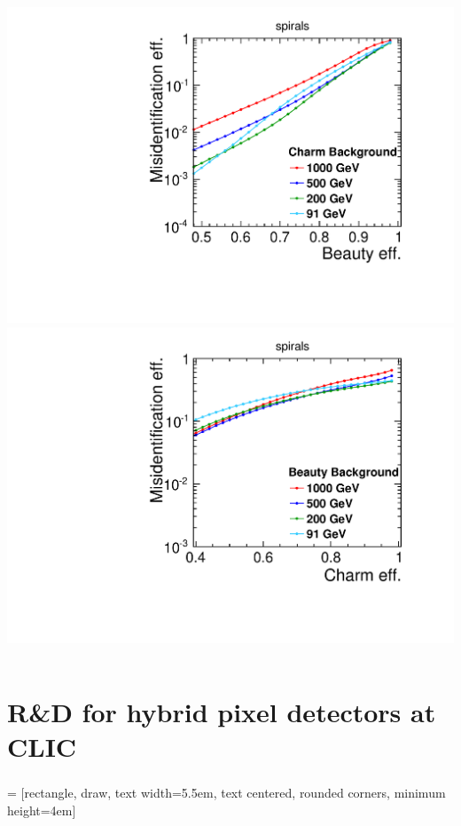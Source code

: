 \begin{frame}
  \begin{columns}
    \centering
    \includegraphics[width=\textwidth]{figures/Global_energies_CLIC_SiD_spirals_Beauty_Charm_.pdf}
    \centering
    \includegraphics[width=\textwidth]{figures/Global_energies_CLIC_SiD_spirals_Charm_Beauty_.pdf}
  \end{columns}

\end{frame}


\section{R\&D for hybrid pixel detectors at CLIC}
\begin{frame}
  \frametitle{}
  \tableofcontents[currentsection]
\end{frame}
 = [rectangle, draw, text width=5.5em, text centered, rounded corners, minimum
height=4em]
\usetikzlibrary{backgrounds,fit,decorations.pathreplacing} 

